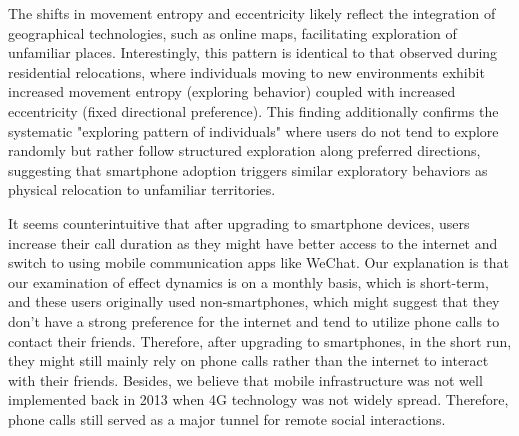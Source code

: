 The shifts in movement entropy and eccentricity likely reflect the integration of geographical technologies, such as online maps, facilitating exploration of unfamiliar places.
Interestingly, this pattern is identical to that observed during residential relocations, where individuals moving to new environments exhibit increased movement entropy (exploring behavior) coupled with increased eccentricity (fixed directional preference).
This finding additionally confirms the systematic "exploring pattern of individuals" where users do not tend to explore randomly but rather follow structured exploration along preferred directions, suggesting that smartphone adoption triggers similar exploratory behaviors as physical relocation to unfamiliar territories.

It seems counterintuitive that after upgrading to smartphone devices, users increase their call duration as they might have better access to the internet and switch to using mobile communication apps like WeChat.
Our explanation is that our examination of effect dynamics is on a monthly basis, which is short-term, and these users originally used non-smartphones, which might suggest that they don't have a strong preference for the internet and tend to utilize phone calls to contact their friends.
Therefore, after upgrading to smartphones, in the short run, they might still mainly rely on phone calls rather than the internet to interact with their friends.
Besides, we believe that mobile infrastructure was not well implemented back in 2013 when 4G technology was not widely spread.
Therefore, phone calls still served as a major tunnel for remote social interactions.
